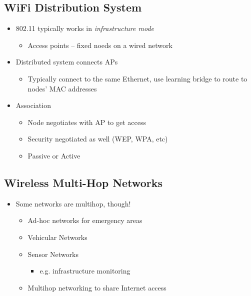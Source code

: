 \subsection{WiFi Distribution System}
\begin{itemize}[nosep]
    \item 802.11 typically works in \emph{infrastructure mode}
          \begin{itemize}[nosep]
              \item Access points -- fixed noeds on a wired network
          \end{itemize}
    \item Distributed system connects APs
          \begin{itemize}[nosep]
              \item Typically connect to the same Ethernet, use learning bridge to route to nodes' MAC addresses
          \end{itemize}
    \item Association
          \begin{itemize}[nosep]
              \item Node negotiates with AP to get access
              \item Security negotiated as well (WEP, WPA, etc)
              \item Passive or Active
          \end{itemize}
\end{itemize}

\subsection{Wireless Multi-Hop Networks}
\begin{itemize}[nosep]
    \item Some networks are multihop, though!
          \begin{itemize}[nosep]
              \item Ad-hoc networks for emergency areas
              \item Vehicular Networks
              \item Sensor Networks
                    \begin{itemize}[nosep]
                        \item e.g. infrastructure monitoring
                    \end{itemize}
              \item Multihop networking to share Internet access
          \end{itemize}
\end{itemize}

